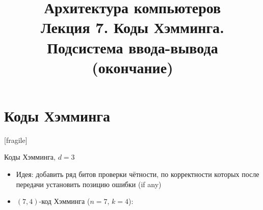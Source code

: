 \newcommand{\h}{handout,
}



\title[Коды Хэмминга. Подсистема I/O (2)]{Архитектура компьютеров\texorpdfstring{\\}{ }Лекция 7. Коды Хэмминга.\texorpdfstring{\\}{ }Подсистема ввода-вывода (окончание)}



\begin{frame}
\titlepage
\end{frame}

\section{Коды Хэмминга}[fragile]

\begin{frame}{Коды Хэмминга, $d=3$}
\begin{itemize}[<+->]

    \item Идея: добавить ряд битов проверки чётности, по корректности
        которых после передачи установить позицию ошибки (if any)

    \item
            $(7, 4)$-код Хэмминга ($n = 7$, $k = 4$):



\end{itemize}
\end{frame}
